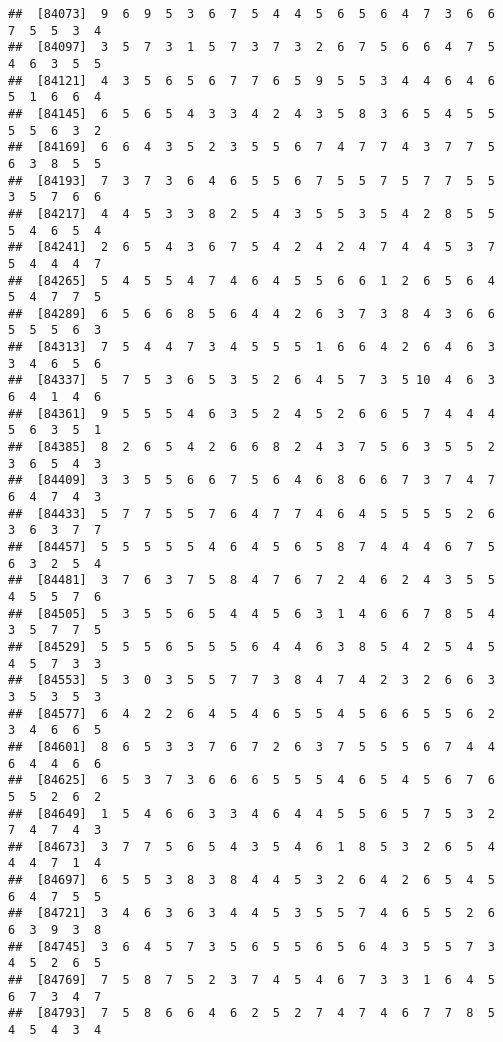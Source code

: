 \documentclass[
]{book}
\begin{document}
\begin{verbatim}
##  [84073]  9  6  9  5  3  6  7  5  4  4  5  6  5  6  4  7  3  6  6  7  5  5  3  4
##  [84097]  3  5  7  3  1  5  7  3  7  3  2  6  7  5  6  6  4  7  5  4  6  3  5  5
##  [84121]  4  3  5  6  5  6  7  7  6  5  9  5  5  3  4  4  6  4  6  5  1  6  6  4
##  [84145]  6  5  6  5  4  3  3  4  2  4  3  5  8  3  6  5  4  5  5  5  5  6  3  2
##  [84169]  6  6  4  3  5  2  3  5  5  6  7  4  7  7  4  3  7  7  5  6  3  8  5  5
##  [84193]  7  3  7  3  6  4  6  5  5  6  7  5  5  7  5  7  7  5  5  3  5  7  6  6
##  [84217]  4  4  5  3  3  8  2  5  4  3  5  5  3  5  4  2  8  5  5  5  4  6  5  4
##  [84241]  2  6  5  4  3  6  7  5  4  2  4  2  4  7  4  4  5  3  7  5  4  4  4  7
##  [84265]  5  4  5  5  4  7  4  6  4  5  5  6  6  1  2  6  5  6  4  5  4  7  7  5
##  [84289]  6  5  6  6  8  5  6  4  4  2  6  3  7  3  8  4  3  6  6  5  5  5  6  3
##  [84313]  7  5  4  4  7  3  4  5  5  5  1  6  6  4  2  6  4  6  3  3  4  6  5  6
##  [84337]  5  7  5  3  6  5  3  5  2  6  4  5  7  3  5 10  4  6  3  6  4  1  4  6
##  [84361]  9  5  5  5  4  6  3  5  2  4  5  2  6  6  5  7  4  4  4  5  6  3  5  1
##  [84385]  8  2  6  5  4  2  6  6  8  2  4  3  7  5  6  3  5  5  2  3  6  5  4  3
##  [84409]  3  3  5  5  6  6  7  5  6  4  6  8  6  6  7  3  7  4  7  6  4  7  4  3
##  [84433]  5  7  7  5  5  7  6  4  7  7  4  6  4  5  5  5  5  2  6  3  6  3  7  7
##  [84457]  5  5  5  5  5  4  6  4  5  6  5  8  7  4  4  4  6  7  5  6  3  2  5  4
##  [84481]  3  7  6  3  7  5  8  4  7  6  7  2  4  6  2  4  3  5  5  4  5  5  7  6
##  [84505]  5  3  5  5  6  5  4  4  5  6  3  1  4  6  6  7  8  5  4  3  5  7  7  5
##  [84529]  5  5  5  6  5  5  5  6  4  4  6  3  8  5  4  2  5  4  5  4  5  7  3  3
##  [84553]  5  3  0  3  5  5  7  7  3  8  4  7  4  2  3  2  6  6  3  3  5  3  5  3
##  [84577]  6  4  2  2  6  4  5  4  6  5  5  4  5  6  6  5  5  6  2  3  4  6  6  5
##  [84601]  8  6  5  3  3  7  6  7  2  6  3  7  5  5  5  6  7  4  4  6  4  4  6  6
##  [84625]  6  5  3  7  3  6  6  6  5  5  5  4  6  5  4  5  6  7  6  5  5  2  6  2
##  [84649]  1  5  4  6  6  3  3  4  6  4  4  5  5  6  5  7  5  3  2  7  4  7  4  3
##  [84673]  3  7  7  5  6  5  4  3  5  4  6  1  8  5  3  2  6  5  4  4  4  7  1  4
##  [84697]  6  5  5  3  8  3  8  4  4  5  3  2  6  4  2  6  5  4  5  6  4  7  5  5
##  [84721]  3  4  6  3  6  3  4  4  5  3  5  5  7  4  6  5  5  2  6  6  3  9  3  8
##  [84745]  3  6  4  5  7  3  5  6  5  5  6  5  6  4  3  5  5  7  3  4  5  2  6  5
##  [84769]  7  5  8  7  5  2  3  7  4  5  4  6  7  3  3  1  6  4  5  6  7  3  4  7
##  [84793]  7  5  8  6  6  4  6  2  5  2  7  4  7  4  6  7  7  8  5  4  5  4  3  4

\end{verbatim}
\end{document}
